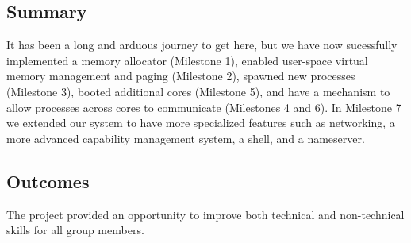 \subsection{Summary}
It has been a long and arduous journey to get here, but we have now sucessfully implemented a memory allocator (Milestone 1), enabled user-space virtual memory management and paging (Milestone 2), spawned new processes (Milestone 3), booted additional cores (Milestone 5), and have a mechanism to allow processes across cores to communicate (Milestones 4 and 6). In Milestone 7 we extended our system to have more specialized features such as networking, a more advanced capability management system, a shell, and a nameserver.  

\subsection{Outcomes}
The project provided an opportunity to improve both technical and non-technical skills for all group members.
